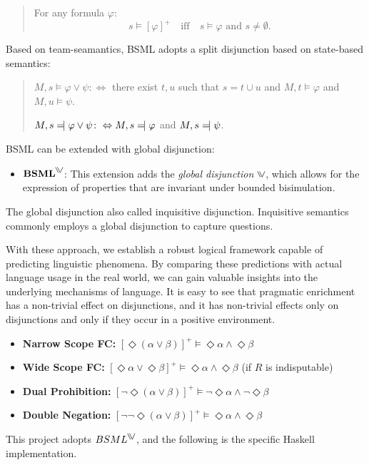 \begin{quote}
For any formula \( \varphi \): 
\[
s \models {[ \varphi ]}^+ \quad \text{iff} \quad s \models \varphi \text{ and } s \neq \emptyset.
\]
\end{quote}

 Based on team-seamantics, BSML adopts a split disjunction based on state-based semantics:

\begin{quote}
    $M, s \models \varphi \vee \psi \colon \Leftrightarrow$ there exist $t, u$ such that $s = t \cup u$ and $M, t \models \varphi$ and $M, u \models \psi$.
    
    $M, s \leftmodels \varphi \vee \psi \colon \Leftrightarrow M, s \leftmodels \varphi$ and $M, s \leftmodels \psi$.
\end{quote}


BSML can be extended with global disjunction:
\begin{itemize}
    \item \(\textbf{BSML}^{\inqdisj}\): This extension adds the \textit{global disjunction} \(\inqdisj\), which allows for the expression of properties that are invariant under bounded bisimulation.
\end{itemize}

The global disjunction also called inquisitive disjunction. 
Inquisitive semantics commonly employs a global disjunction to capture questions. 


With these approach, we establish a robust logical framework capable of predicting linguistic phenomena. 
By comparing these predictions with actual language usage in the real world, we can gain valuable insights into the underlying mechanisms of language.
It is easy to see that pragmatic enrichment has a non-trivial effect on disjunctions, 
and it has non-trivial effects only on disjunctions and only if they occur in a positive environment.  

\begin{itemize}
    \item \textbf{Narrow Scope FC:} \quad ${[ \Diamond (\alpha \lor \beta) ]}^+ \models \Diamond \alpha \land \Diamond \beta$
    \item \textbf{Wide Scope FC:} \quad ${[\Diamond \alpha \lor \Diamond \beta]}^+ \models \Diamond \alpha \land \Diamond \beta$ 
          \quad (if $R$ is indisputable)
    \item \textbf{Dual Prohibition:} \quad ${[\neg \Diamond (\alpha \lor \beta)]}^+ \models \neg \Diamond \alpha \land \neg \Diamond \beta$
    \item \textbf{Double Negation:} \quad ${[\neg \neg \Diamond (\alpha \lor \beta)]}^+ \models \Diamond \alpha \land \Diamond \beta$
 \end{itemize}
 
 This project adopts $BSML^{\inqdisj}$, and the following is the specific Haskell implementation.
   